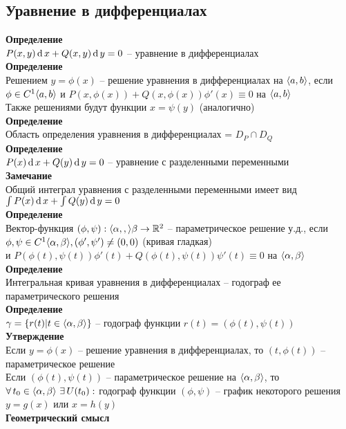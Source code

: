 \documentclass[12pt]{article}
\begin{document}
\subsection{Уравнение в дифференциалах}
\textbf{Определение}\\
$P(x,y)\operatorname{d} x + Q(x,y)\operatorname{d} y = 0$ -- уравнение в дифференциалах\\
\textbf{Определение}\\
Решением $y=\phi(x)$ -- решение уравнения в дифференциалах на $\langle a, b \rangle$, если $\phi \in C^1\langle a, b \rangle$ и $P(x, \phi(x)) + Q(x, \phi(x))\phi'(x) \equiv 0$ на $\langle a, b \rangle$\\
Также решениями будут функции $x=\psi(y)$ (аналогично)\\
\textbf{Определение}\\
Область определения уравнения в дифференциалах = $D_P \cap D_Q$\\
\textbf{Определение}\\
$P(x)\operatorname{d} x + Q(y)\operatorname{d} y = 0$ -- уравнение с разделенными переменными\\
\textbf{Замечание}\\
Общий интеграл уравнения с разделенными переменными имеет вид $\int P(x)\operatorname{d} x + \int Q(y)\operatorname{d} y = 0$\\
\textbf{Определение}\\
Вектор-функция $(\phi, \psi): \langle \alpha, , \rangle \beta \rightarrow \mathbb{R}^2$ -- параметрическое решение у.д., если $\phi, \psi \in C^1\langle \alpha, \beta \rangle, (\phi', \psi') \neq (0, 0)$ (кривая гладкая)\\
и $P(\phi(t), \psi(t))\phi'(t) + Q(\phi(t), \psi(t))\psi'(t) \equiv 0$ на $\langle \alpha, \beta \rangle$\\
\textbf{Определение}\\
Интегральная кривая уравнения в дифференциалах -- годограф ее параметрического решения\\
\textbf{Определение}\\
$\gamma = \{ r(t) | t \in \langle \alpha, \beta \rangle\}$ -- годограф функции $r(t) = (\phi(t), \psi(t))$\\
\textbf{Утверждение}\\
Если $y=\phi(x)$ -- решение уравнения в дифференциалах, то $(t, \phi(t))$ -- параметрическое решение\\
Если $(\phi(t), \psi(t))$ -- параметрическое решение на $\langle \alpha, \beta \rangle$, то $\forall\, t_0\in \langle \alpha, \beta \rangle\ \exists\, U(t_0):$ годограф функции $(\phi, \psi)$ -- график некоторого решения $y = g(x)$ или $x = h(y)$\\
\textbf{Геометрический смысл}\\
\end{document}
